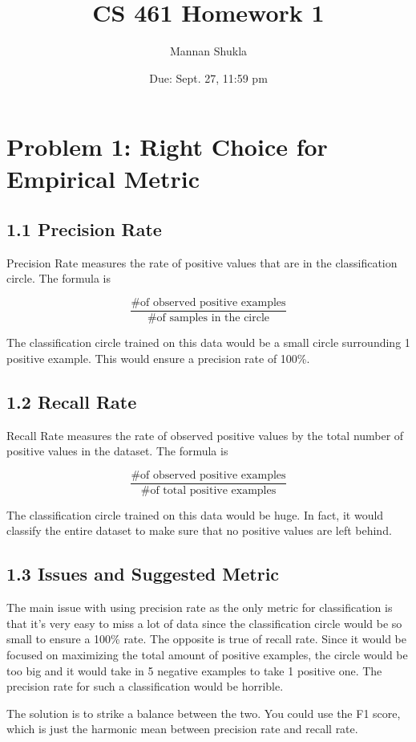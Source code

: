 \documentclass{article}
\title{CS 461 Homework 1}
\author{Mannan Shukla}
\date{Due: Sept. 27, 11:59 pm}
\begin{document}
\maketitle

\section*{Problem 1: Right Choice for Empirical Metric}

\subsection*{1.1 Precision Rate}
Precision Rate measures the rate of positive values that are in the classification
circle. The formula is

\[
\frac{\text{\# of observed positive examples}}{\text{\# of samples in the circle}}
\]

The classification circle trained on this data would be a small circle surrounding
1 positive example. This would ensure a precision rate of 100\%.

\subsection*{1.2 Recall Rate}
Recall Rate measures the rate of observed positive values by the total number
of positive values in the dataset. The formula is

\[
\frac{\text{\# of observed positive examples}}{\text{\# of total positive examples}}
\]

The classification circle trained on this data would be huge. In fact, it would
classify the entire dataset to make sure that no positive values are left behind.

\subsection*{1.3 Issues and Suggested Metric}
The main issue with using precision rate as the only metric for classification
is that it’s very easy to miss a lot of data since the classification circle would
be so small to ensure a 100\% rate. The opposite is true of recall rate. Since
it would be focused on maximizing the total amount of positive examples, the
circle would be too big and it would take in 5 negative examples to take 1
positive one. The precision rate for such a classification would be horrible.

The solution is to strike a balance between the two. You could use the F1
score, which is just the harmonic mean between precision rate and recall rate.
\end{document}
